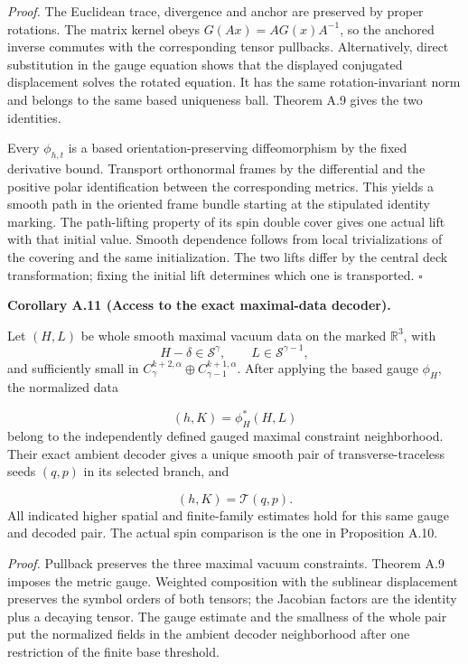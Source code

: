 \documentclass[
  english,
  11pt,
  reqno]{amsart}
\makeatletter
\newcommand{\pandocstatementheading}[1]{%
  \par\addpenalty{\@beginparpenalty}%
  \addvspace{.5\baselineskip plus .2\baselineskip minus .2\baselineskip}%
  {\normalfont\bfseries #1\par}%
  \nobreak\@afterindenttrue\@afterheading
}
\makeatother
\begin{document}
\emph{Proof.} The Euclidean trace, divergence and anchor are preserved
by proper rotations. The matrix kernel obeys \(G(Ax)=AG(x)A^{-1}\), so
the anchored inverse commutes with the corresponding tensor pullbacks.
Alternatively, direct substitution in the gauge equation shows that the
displayed conjugated displacement solves the rotated equation. It has
the same rotation-invariant norm and belongs to the same based
uniqueness ball. Theorem A.9 gives the two identities.

Every \(\phi_{h,t}\) is a based orientation-preserving diffeomorphism by
the fixed derivative bound. Transport orthonormal frames by the
differential and the positive polar identification between the
corresponding metrics. This yields a smooth path in the oriented frame
bundle starting at the stipulated identity marking. The path-lifting
property of its spin double cover gives one actual lift with that
initial value. Smooth dependence follows from local trivializations of
the covering and the same initialization. The two lifts differ by the
central deck transformation; fixing the initial lift determines which
one is transported. \hfill\(\square\)

\pandocstatementheading{\leavevmode{}\label{cor:online-gauge-whole-data-decoding}Corollary A.11 (Access to the exact maximal-data decoder).}

Let \((H,L)\) be whole smooth maximal vacuum data on the marked
\(\mathbb R^3\), with \[
H-\delta\in\mathscr S^\gamma,
\qquad L\in\mathscr S^{\gamma-1},
\] and sufficiently small in
\(C^{k+2,\alpha}_\gamma\oplus C^{k+1,\alpha}_{\gamma-1}\). After
applying the based gauge \(\phi_H\), the normalized data

\label{eq:online-gauge-normalized-whole-data} \[
(h,K)=\phi_H^*(H,L)
\] belong to the independently defined gauged maximal constraint
neighborhood. Their exact ambient decoder gives a unique smooth pair of
transverse-traceless seeds \((q,p)\) in its selected branch, and

\label{eq:online-gauge-exact-chart-recovery} \[
(h,K)=\mathcal T(q,p).
\] All indicated higher spatial and finite-family estimates hold for
this same gauge and decoded pair. The actual spin comparison is the one
in Proposition A.10.

\emph{Proof.} Pullback preserves the three maximal vacuum constraints.
Theorem A.9 imposes the metric gauge. Weighted composition with the
sublinear displacement preserves the symbol orders of both tensors; the
Jacobian factors are the identity plus a decaying tensor. The gauge
estimate and the smallness of the whole pair put the normalized fields
in the ambient decoder neighborhood after one restriction of the finite
base threshold.
\end{document}
